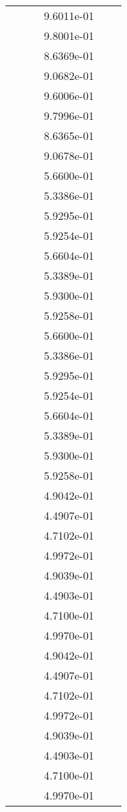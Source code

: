 \begin{xltabular}{\textwidth}{r|rS[table-format=1.3e+2]S[table-format=1.4e+2]S[table-format=1.4e+2]S[table-format=-1.5]}
&  &  & 9.6011e-01 & & \\
&  &  & 9.8001e-01 & & \\
&  &  & 8.6369e-01 & & \\
&  &  & 9.0682e-01 & & \\
&  &  & 9.6006e-01 & & \\
&  &  & 9.7996e-01 & & \\
&  &  & 8.6365e-01 & & \\
&  &  & 9.0678e-01 & & \\
&  &  & 5.6600e-01 & & \\
&  &  & 5.3386e-01 & & \\
&  &  & 5.9295e-01 & & \\
&  &  & 5.9254e-01 & & \\
&  &  & 5.6604e-01 & & \\
&  &  & 5.3389e-01 & & \\
&  &  & 5.9300e-01 & & \\
&  &  & 5.9258e-01 & & \\
&  &  & 5.6600e-01 & & \\
&  &  & 5.3386e-01 & & \\
&  &  & 5.9295e-01 & & \\
&  &  & 5.9254e-01 & & \\
&  &  & 5.6604e-01 & & \\
&  &  & 5.3389e-01 & & \\
&  &  & 5.9300e-01 & & \\
&  &  & 5.9258e-01 & & \\
&  &  & 4.9042e-01 & & \\
&  &  & 4.4907e-01 & & \\
&  &  & 4.7102e-01 & & \\
&  &  & 4.9972e-01 & & \\
&  &  & 4.9039e-01 & & \\
&  &  & 4.4903e-01 & & \\
&  &  & 4.7100e-01 & & \\
&  &  & 4.9970e-01 & & \\
&  &  & 4.9042e-01 & & \\
&  &  & 4.4907e-01 & & \\
&  &  & 4.7102e-01 & & \\
&  &  & 4.9972e-01 & & \\
&  &  & 4.9039e-01 & & \\
&  &  & 4.4903e-01 & & \\
&  &  & 4.7100e-01 & & \\
&  &  & 4.9970e-01 & & \\

\end{xltabular}

